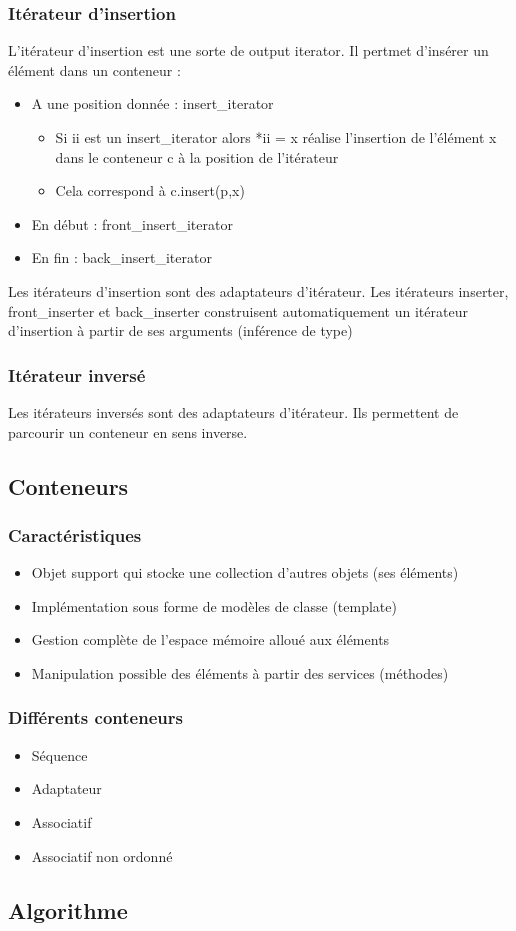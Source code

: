 \documentclass[10pt,a4paper,twoside]{article}
\begin{document}
\subsubsection{Itérateur d'insertion}
L'itérateur d'insertion est une sorte de output iterator. Il pertmet d'insérer un élément dans un conteneur :
\begin{itemize}
\item A une position donnée : insert\_iterator
\begin{itemize}
\item Si ii est un insert\_iterator alors *ii = x réalise l'insertion de l'élément x dans le conteneur c à la position de l'itérateur
\item Cela correspond à c.insert(p,x)
\end{itemize}
\item En début : front\_insert\_iterator
\item En fin : back\_insert\_iterator
\end{itemize}
Les itérateurs d'insertion sont des adaptateurs d'itérateur. Les itérateurs inserter, front\_inserter et back\_inserter construisent automatiquement un itérateur d'insertion à partir de ses arguments (inférence de type)

\subsubsection{Itérateur inversé}
Les itérateurs inversés sont des adaptateurs d'itérateur. Ils permettent de parcourir un conteneur en sens inverse.

\subsection{Conteneurs}
\subsubsection{Caractéristiques}
\begin{itemize}
\item Objet support qui stocke une collection d'autres objets (ses éléments)
\item Implémentation sous forme de modèles de classe (template)
\item Gestion complète de l'espace mémoire alloué aux éléments
\item Manipulation possible des éléments à partir des services (méthodes)
\end{itemize}

\subsubsection{Différents conteneurs}
\begin{itemize}
\item Séquence
\item Adaptateur
\item Associatif
\item Associatif non ordonné
\end{itemize}

\subsection{Algorithme}
\end{document}
